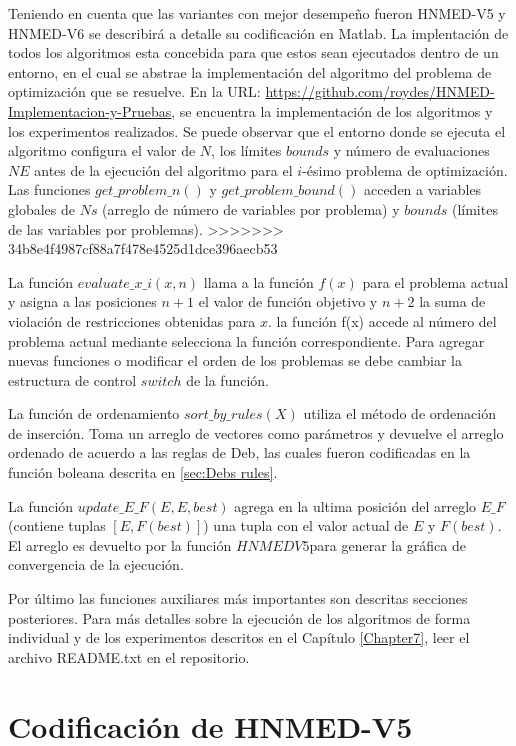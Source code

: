 Teniendo en cuenta que las variantes con mejor desempeño fueron HNMED-V5 y HNMED-V6 se describirá a detalle su codificación en Matlab. La implentación de todos los algoritmos esta concebida para que estos sean ejecutados dentro de un entorno, en el cual se abstrae la implementación del algoritmo del problema de optimización que se resuelve. En la URL:  \url{https://github.com/roydes/HNMED-Implementacion-y-Pruebas}, se encuentra la implementación de los algoritmos y los experimentos realizados. Se puede observar que el entorno donde se ejecuta el algoritmo configura el valor de $N$, los límites $bounds$ y número de evaluaciones $NE$ antes de la ejecución del algoritmo para el $i$-ésimo problema de optimización. Las funciones $get\_problem\_n()$ y $get\_problem\_bound()$ acceden a variables globales  de $Ns$ (arreglo de número de variables por problema) y $bounds$ (límites de las variables por problemas).
>>>>>>> 34b8e4f4987cf88a7f478e4525d1dce396aecb53

 La función $evaluate\_x\_i(x,n)$ llama a la función $f(x)$ para el problema actual y asigna a las posiciones $n+1$ el valor de función objetivo y $n+2$ la suma de violación de restricciones obtenidas para  $x$. la función f(x) accede al número del problema actual mediante selecciona la función correspondiente. Para agregar nuevas funciones o modificar el orden de los problemas se debe cambiar la estructura de control $switch$ de la función.
 
 La función de ordenamiento $sort\_by\_rules(X)$ utiliza el método de ordenación de inserción. Toma un arreglo de vectores como parámetros y devuelve el arreglo ordenado de acuerdo a las reglas de Deb, las cuales fueron codificadas en la función boleana descrita en \ref{sec:Debs rules}.
 
 La función $update\_E\_F(E,E,best)$ agrega en la ultima posición del arreglo $E\_F$(contiene tuplas $\left[ E,F(best)\right]$) una tupla con el valor actual de $E$ y $F(best)$. El arreglo es devuelto por la función $HNMEDV5$para generar la gráfica de convergencia de la ejecución.
 
Por último las funciones auxiliares más importantes son descritas secciones posteriores. Para más detalles sobre la ejecución de los algoritmos de forma individual y de los experimentos descritos en el Capítulo \ref{Chapter7}, leer el archivo README.txt en el repositorio.     
 
\section{Codificación de HNMED-V5 }

